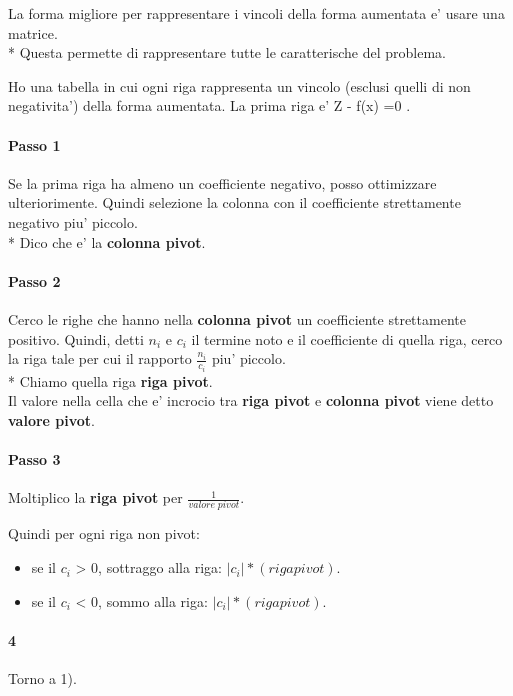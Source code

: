 La forma migliore per rappresentare i vincoli della forma aumentata e' usare una matrice. \\*
Questa permette di rappresentare tutte le caratterische del problema.

Ho una tabella in cui ogni riga rappresenta un vincolo (esclusi quelli di non negativita') della forma aumentata. La prima riga e' Z  - f(x) =0 .

\paragraph{Passo 1}

Se la prima riga ha almeno un coefficiente negativo, posso ottimizzare ulteriorimente.
Quindi selezione la colonna con il coefficiente strettamente negativo piu' piccolo. \\*
Dico che e' la \textbf{colonna pivot}.

\paragraph{Passo 2}

Cerco le righe che hanno nella \textbf{colonna pivot} un coefficiente strettamente positivo.
Quindi, detti $n_i$ e $c_i$ il termine noto e il coefficiente di quella riga, cerco la riga tale per cui il rapporto $\frac {n_i} {c_i}$ piu' piccolo. \\*
Chiamo quella riga \textbf{riga pivot}. \\
Il valore nella cella che e' incrocio tra \textbf{riga pivot} e \textbf{colonna pivot} viene detto \textbf{valore pivot}.

\paragraph{Passo 3}

Moltiplico la \textbf{riga pivot} per $\frac {1} {valore \; pivot}$.

Quindi per ogni riga non pivot:
\begin{itemize}
    \item se il $c_i$ > 0, sottraggo alla riga: $|c_i| * (riga pivot)$.
    \item se il $c_i$ < 0, sommo alla riga: $|c_i| * (riga pivot)$.
\end{itemize}

\paragraph{4}

Torno a 1).
